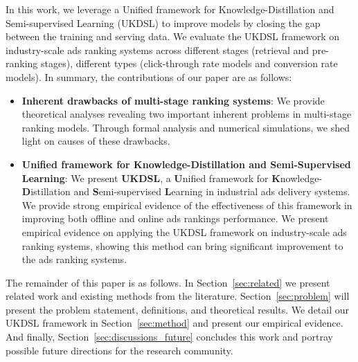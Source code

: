 In this work, we leverage a Unified framework for Knowledge-Distillation and Semi-supervised Learning (UKDSL) to improve models by closing the gap between the training and serving data. We evaluate the UKDSL framework on industry-scale ads ranking systems across different stages (retrieval and pre-ranking stages), different types (click-through rate models and conversion rate models).
In summary, the contributions of our paper are as follows:
\newline
\begin{itemize}
    \item \textbf{Inherent drawbacks of multi-stage ranking systems}: We provide theoretical analyses revealing  two important inherent problems in multi-stage ranking models. Through formal analysis and numerical simulations, we shed light on causes of these drawbacks.
    \item \textbf{\textbf{U}nified framework for Knowledge-Distillation and Semi-Supervised Learning}: We present \textbf{UKDSL}, a \textbf{U}nified framework for \textbf{K}nowledge-\textbf{D}istillation and \textbf{S}emi-supervised \textbf{L}earning in industrial ads delivery systems. We provide strong empirical evidence of the effectiveness of this framework in improving both offline and online ads rankings performance. We present empirical evidence on applying the UKDSL framework on industry-scale ads ranking systems, showing this method can bring significant improvement to the ads ranking systems.    
\end{itemize}
\vspace{6pt}
The remainder of this paper is as follows. In Section~\ref{sec:related} we present related work and existing methods from the literature.
Section~\ref{sec:problem} will present the problem statement, definitions, and theoretical results.
We detail our UKDSL framework in Section~\ref{sec:method} and present our empirical evidence.
And finally, Section~\ref{sec:discussions_future} concludes this work and portray possible future directions for the research community.